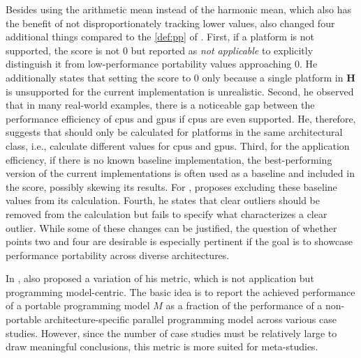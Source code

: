 Besides using the arithmetic mean instead of the harmonic mean, which also has the benefit of not disproportionately tracking lower values, \citeauthor{marowka_toward_2021} also changed four additional things compared to the \autoref{def:pp} of \pp. 
First, if a platform is not supported, the \mpp score is not $0$ but reported as \textit{not applicable} to explicitly distinguish it from low-performance portability values approaching $0$. 
He additionally states that setting the \pp score to $0$ only because a single platform in $\mathbf{H}$ is unsupported for the current implementation is unrealistic. 
Second, he observed that in many real-world examples, there is a noticeable gap between the performance efficiency of \glspl{cpu} and \glspl{gpu} if \glspl{cpu} are even supported. 
He, therefore, suggests that \mpp should only be calculated for platforms in the same architectural class, i.e., calculate different \mpp values for \glspl{cpu} and \glspl{gpu}. 
Third, for the application efficiency, if there is no known baseline implementation, the best-performing version of the current implementations is often used as a baseline and included in the \pp score, possibly skewing its results. 
For \mpp, \citeauthor{marowka_toward_2021} proposes excluding these baseline values from its calculation. 
Fourth, he states that clear outliers should be removed from the calculation but fails to specify what characterizes a clear outlier.
While some of these changes can be justified, the question of whether points two and four are desirable is especially pertinent if the goal is to showcase performance portability across diverse architectures. 

In \cite{marowka_performance_2022}, \citeauthor{marowka_performance_2022} also proposed a variation of his \mpp metric, which is not application but programming model-centric. 
The basic idea is to report the achieved performance of a portable programming model $M$ as a fraction of the performance of a non-portable architecture-specific parallel programming model across various case studies. 
However, since the number of case studies must be relatively large to draw meaningful conclusions, this metric is more suited for meta-studies. 

